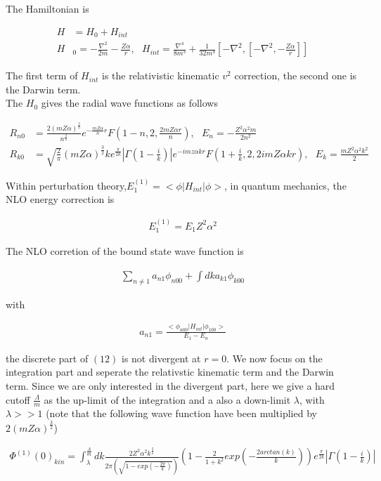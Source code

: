 \documentclass{article}
\begin{document}
The Hamiltonian is

\begin{align}
H&=H_0+H_{int}\\
H&_0=-\frac{\nabla^2}{2m}-\frac{Z\alpha}{r},\ \ \ H_{int}=\frac{\nabla^4}{8m^3}+\frac{1}{32m^4}[-\nabla^2,[-\nabla^2,-\frac{Z\alpha}{r}]]
\end{align}

The first term of $H_{int}$ is the relativistic kinematic $v^2$ correction, the second one is the Darwin term.\\
The $H_0$ gives the radial wave functions as follows

\begin{align}
R_{n0}&=\frac{2(mZ\alpha)^\frac{3}{2}}{n^\frac{3}{2}}e^{-\frac{mZ\alpha}{n}r}F(1-n,2,\frac{2mZ\alpha r}{n}),\ \ \ E_n=-\frac{Z^2\alpha^2m}{2n^2}\\
R_{k0}&=\sqrt{\frac{2}{\pi}}(mZ\alpha)^\frac{3}{2}ke^\frac{\pi}{2k}|\Gamma(1-\frac{i}{k})|e^{-imz\alpha kr}F(1+\frac{i}{k},2,2imZ\alpha kr),\ \ \ E_k=\frac{mZ^2\alpha^2k^2}{2}
\end{align} 

Within perturbation theory,$E_1^{(1)}=<\phi|H_{int}|\phi>$, in quantum mechanics, the NLO energy correction is

\begin{align}
E_1^{(1)}=E_1Z^2\alpha^2
\end{align}

The NLO corretion of the bound state wave function is

\begin{align}
\sum_{n\neq 1}a_{n1}\phi_{n00}+\int dka_{k1}\phi_{k00}
\end{align}

with 

\begin{align}
a_{n1}=\frac{<\phi_{n00}|H_{int}|\phi_{100}>}{E_1-E_n}
\end{align}

the discrete part of $(12)$ is not divergent at $r=0$. We now focus on the integration part and seperate the relativstic kinematic term and the Darwin term. Since we are only interested in the divergent part, here we give a hard cutoff $\frac{\Lambda}{m}$ as the up-limit of the integration and a also a down-limit $\lambda$, with $\lambda>>1$ (note that the following wave function have been multiplied by $2(mZ\alpha)^\frac{3}{2}$)

\begin{align}
\Phi^{(1)}(0)_{kin}=\int_\lambda^\frac{\Lambda}{m}dk \frac{2Z^2\alpha^2k^\frac{3}{2}}{2\pi(\sqrt{1-exp(-\frac{2 \pi}{k})})}(1-\frac{2}{1+k^2}exp(-\frac{2arctan(k)}{k}))e^\frac{\pi}{2k}|\Gamma(1-\frac{i}{k})|
\end{align}
\end{document}
